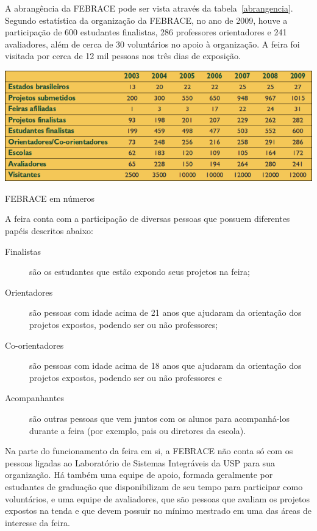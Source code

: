 A abrangência da FEBRACE pode ser vista através da tabela~\ref{abrangencia}. Segundo estatística da organização da FEBRACE, no ano de 2009, houve a participação de 600 estudantes finalistas, 286 professores orientadores e 241 avaliadores, além de cerca de 30 voluntários no apoio à organização. A feira foi visitada por cerca de 12 mil pessoas nos três dias de exposição. 

\begin{table}[h]
    \begin{center}
        \includegraphics[width=0.8\linewidth]{arquivos/abrangencia.png}
    \end{center}
    \caption{FEBRACE em números}
    \label{abrangencia}
\end{table}

A feira conta com a participação de diversas pessoas que possuem diferentes papéis descritos abaixo:

\begin{description}
    \item[Finalistas] 
        são os estudantes que estão expondo seus projetos na feira;
    \item[Orientadores] 
        são pessoas com idade acima de 21 anos que ajudaram da orientação dos projetos expostos, podendo ser ou não professores;
    \item[Co-orientadores] 
        são pessoas com idade acima de 18 anos que ajudaram da orientação dos projetos expostos, podendo ser ou não professores e
    \item[Acompanhantes] 
        são outras pessoas que vem juntos com os alunos para acompanhá-los durante a feira (por exemplo, pais ou diretores da escola).
\end{description}

Na parte do funcionamento da feira em si, a FEBRACE não conta só com os pessoas ligadas ao Laboratório de Sistemas Integráveis da USP para sua organização. Há também uma equipe de apoio, formada geralmente por estudantes de graduação que disponibilizam de seu tempo para participar como voluntários, e uma equipe de avaliadores, que são pessoas que avaliam os projetos expostos na tenda e que devem possuir no mínimo mestrado em uma das áreas de interesse da feira.

